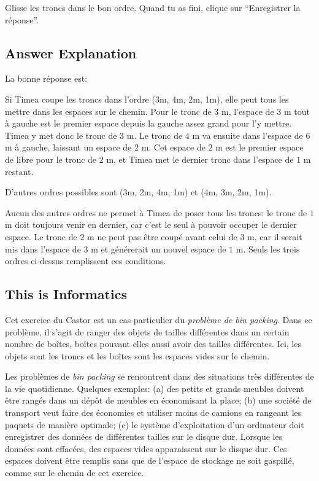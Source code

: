 \documentclass[a4paper,11pt]{report}
\newcommand{\taskGraphicsFolder}{..}
\begin{document}
Glisse les troncs dans le bon ordre. Quand tu as fini, clique sur “Enregistrer la réponse”.


\subsection*{Answer Explanation}

La bonne réponse est:

{\centering%
\par}

Si Timea coupe les troncs dans l’ordre (3\thinspace{}m, 4\thinspace{}m, 2\thinspace{}m, 1\thinspace{}m), elle peut tous les mettre dans les espaces sur le chemin.
Pour le tronc de $3$ m, l’espace de $3$ m tout à gauche est le premier espace depuis la gauche assez grand pour l’y mettre. Timea y met donc le tronc de $3$ m. Le tronc de $4$ m va ensuite dans l’espace de $6$ m à gauche, laissant un espace de $2$ m. Cet espace de $2$ m est le premier espace de libre pour le tronc de $2$ m, et Timea met le dernier tronc dans l’espace de $1$ m restant.

D’autres ordres possibles sont (3\thinspace{}m, 2\thinspace{}m, 4\thinspace{}m, 1\thinspace{}m) et (4\thinspace{}m, 3\thinspace{}m, 2\thinspace{}m, 1\thinspace{}m).

Aucun des autres ordres ne permet à Timea de poser tous les troncs: le tronc de $1$ m doit toujours venir en dernier, car c’est le seul à pouvoir occuper le dernier espace. Le tronc de $2$ m ne peut pas être coupé avant celui de $3$ m, car il serait mis dans l’espace de $3$ m et générerait un nouvel espace de $1$ m. Seuls les trois ordres ci-dessus remplissent ces conditions.


\subsection*{This is Informatics}

Cet exercice du Castor est un cas particulier du \emph{problème de bin packing}. Dans ce problème, il s’agit de ranger des objets de tailles différentes dans un certain nombre de boîtes, boîtes pouvant elles aussi avoir des tailles différentes. Ici, les objets sont les troncs et les boîtes sont les espaces vides sur le chemin.

Les problèmes de \emph{bin packing} se rencontrent dans des situations très différentes de la vie quotidienne. Quelques exemples: (a) des petits et grands meubles doivent être rangés dans un dépôt de meubles en économisant la place; (b) une société de transport veut faire des économies et utiliser moins de camions en rangeant les paquets de manière optimale; (c) le système d’exploitation d’un ordinateur doit enregistrer des données de différentes tailles sur le disque dur. Lorsque les données sont effacées, des espaces vides apparaissent sur le disque dur. Ces espaces doivent être remplis sans que de l’espace de stockage ne soit gaspillé, comme sur le chemin de cet exercice.
\end{document}
